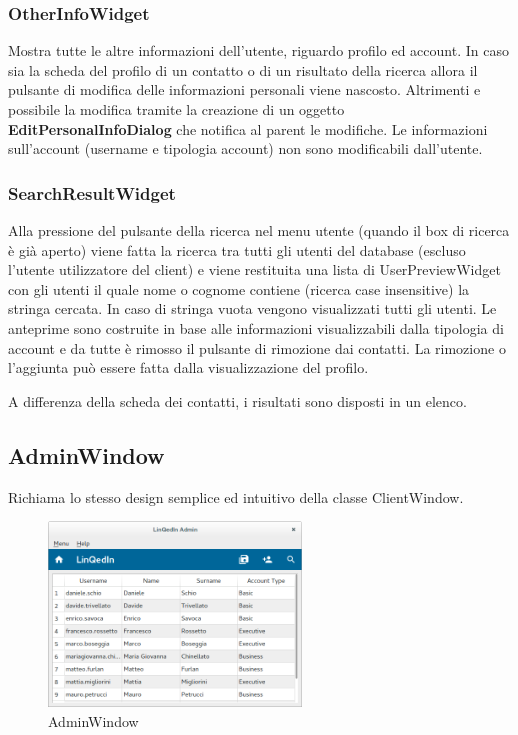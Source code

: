 \documentclass[a4paper]{article}
\begin{document}
\subsubsection*{OtherInfoWidget}
Mostra tutte le altre informazioni dell'utente, riguardo profilo ed account. In caso sia la scheda del profilo di un contatto o di un risultato della ricerca allora il pulsante di modifica delle informazioni personali viene nascosto. Altrimenti e possibile la modifica tramite la creazione di un oggetto \textbf{EditPersonalInfoDialog} che notifica al parent le modifiche. Le informazioni sull'account (username e tipologia account) non sono modificabili dall'utente.

\subsubsection*{SearchResultWidget}
Alla pressione del pulsante della ricerca nel menu utente (quando il box di ricerca è già aperto) viene fatta la ricerca tra tutti gli utenti del database (escluso l'utente utilizzatore del client) e viene restituita una lista di UserPreviewWidget con gli utenti il quale nome o cognome contiene (ricerca case insensitive) la stringa cercata. In caso di stringa vuota vengono visualizzati tutti gli utenti. Le anteprime sono costruite in base alle informazioni visualizzabili dalla tipologia di account e da tutte è rimosso il pulsante di rimozione dai contatti. La rimozione o l'aggiunta può essere fatta dalla visualizzazione del profilo.

A differenza della scheda dei contatti, i risultati sono disposti in un elenco.

\subsection*{AdminWindow}
Richiama lo stesso design semplice ed intuitivo della classe ClientWindow.

\begin{figure}[!ht]
\centering
\includegraphics[width=0.6\textwidth]{AdminWindow.png}
\caption{AdminWindow}
\end{figure}
\end{document}
